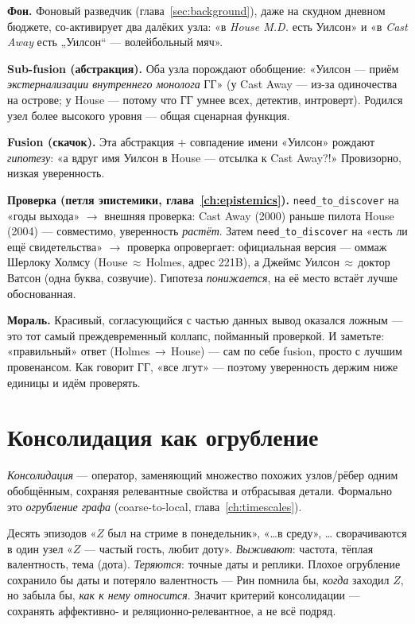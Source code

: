 \begin{workedbox}
\textbf{Фон.} Фоновый разведчик (глава~\ref{sec:background}), даже на скудном дневном
бюджете, со-активирует два далёких узла: «в \emph{House M.D.} есть Уилсон» и «в
\emph{Cast Away} есть „Уилсон“ — волейбольный мяч».

\textbf{Sub-fusion (абстракция).} Оба узла порождают обобщение: «Уилсон — приём
\emph{экстернализации внутреннего монолога} ГГ» (у Cast Away — из-за одиночества на
острове; у House — потому что ГГ умнее всех, детектив, интроверт). Родился узел более
высокого уровня — общая сценарная функция.

\textbf{Fusion (скачок).} Эта абстракция $+$ совпадение имени «Уилсон» рождают
\emph{гипотезу}: «а вдруг имя Уилсон в House — отсылка к Cast Away?!» Провизорно,
низкая уверенность.

\textbf{Проверка (петля эпистемики, глава~\ref{ch:epistemics}).}
\texttt{need\_to\_discover} на «годы выхода» $\to$ внешняя проверка: Cast Away (2000)
раньше пилота House (2004) — совместимо, уверенность \emph{растёт}. Затем
\texttt{need\_to\_discover} на «есть ли ещё свидетельства» $\to$ проверка
опровергает: официальная версия — оммаж Шерлоку Холмсу (House\,$\approx$\,Holmes,
адрес 221B), а Джеймс Уилсон\,$\approx$\,доктор Ватсон (одна буква, созвучие).
Гипотеза \emph{понижается}, на её место встаёт лучше обоснованная.

\textbf{Мораль.} Красивый, согласующийся с частью данных вывод оказался ложным —
это тот самый преждевременный коллапс, пойманный проверкой. И заметьте: «правильный»
ответ (Holmes\,$\to$\,House) — сам по себе fusion, просто с лучшим провенансом. Как
говорит ГГ, «все лгут» — поэтому уверенность держим ниже единицы и идём проверять.
\end{workedbox}

\section{Консолидация как огрубление}

\begin{definition}
\emph{Консолидация} — оператор, заменяющий множество похожих узлов/рёбер одним
обобщённым, сохраняя релевантные свойства и отбрасывая детали. Формально это
\emph{огрубление графа} (coarse-to-local, глава~\ref{ch:timescales}).
\end{definition}

\begin{workedbox}
Десять эпизодов «$Z$ был на стриме в понедельник», «\ldots в среду», \ldots
сворачиваются в один узел «$Z$ — частый гость, любит доту». \emph{Выживают}:
частота, тёплая валентность, тема (дота). \emph{Теряются}: точные даты и реплики.
Плохое огрубление сохранило бы даты и потеряло валентность — Рин помнила бы,
\emph{когда} заходил $Z$, но забыла бы, \emph{как к нему относится}. Значит критерий
консолидации — сохранять аффективно- и реляционно-релевантное, а не всё подряд.
\end{workedbox}

